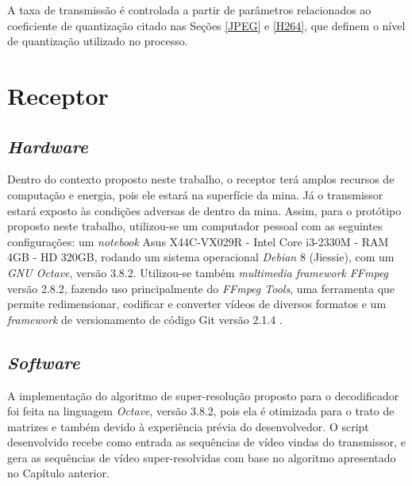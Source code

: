     A taxa de transmissão é controlada a partir de parâmetros relacionados ao coeficiente de quantização citado nas Seções \ref{JPEG} e \ref{H264}, que definem o nível de quantização utilizado no processo. 

\section{Receptor}

\subsection{\textit{Hardware}}

    Dentro do contexto proposto neste trabalho, o receptor terá amplos recursos de computação e energia, pois ele estará na superfície da mina. Já o transmissor estará exposto às condições adversas de dentro da mina. Assim, para o protótipo proposto neste trabalho, utilizou-se um computador pessoal com as seguintes configurações: um \textit{notebook} Asus X44C-VX029R - Intel Core i3-2330M - RAM 4GB - HD 320GB, rodando um sistema operacional \textit{Debian} 8 (Jiessie), com um \textit{GNU Octave}, versão 3.8.2. Utilizou-se também \textit{multimedia framework} \textit{FFmpeg} versão 2.8.2, fazendo uso principalmente do \textit{FFmpeg Tools}, uma ferramenta que permite redimensionar, codificar e converter vídeos de diversos formatos e um \textit{framework} de versionamento de código Git versão 2.1.4 . 


\subsection{\textit{Software}}

    A implementação do algoritmo de super-resolução proposto para o decodificador foi feita na linguagem \textit{Octave}, versão 3.8.2, pois ela é otimizada para o trato de matrizes e também devido à experiência prévia do desenvolvedor. O script desenvolvido recebe como entrada as sequências de vídeo vindas do transmissor, e gera as sequências de vídeo super-resolvidas com base no algoritmo apresentado no Capítulo anterior.

